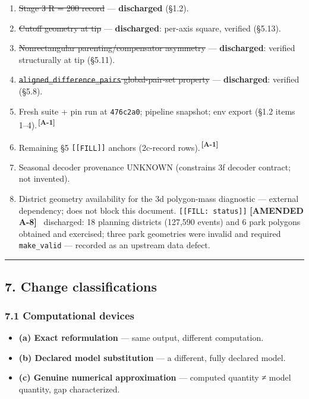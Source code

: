 \documentclass[
  10pt,
]{article}
\def\st#1{#1}  %
\providecommand{\tightlist}{%
  \setlength{\itemsep}{0pt}\setlength{\parskip}{0pt}}
\newcommand{\amdstrike}[1]{\sout{#1}}
\newcommand{\amdstrike}[1]{\textcolor{supcolor}{#1}}
\renewcommand{\st}[1]{\amdstrike{#1}}
\newcommand{\amdref}[1]{{\color{amdcolor}\textsuperscript{\,\textbf{[#1]}}}}
\newcommand{\amd}[1]{{\color{amdcolor}\footnotesize\textbf{[AMENDED #1]}}\ }
\begin{document}
\begin{enumerate}
\def\labelenumi{\arabic{enumi}.}
\setcounter{enumi}{10}
\tightlist
\item
  \st{Stage 3 R = 200 record} --- \textbf{discharged} (§1.2).
\item
  \st{Cutoff geometry at tip} --- \textbf{discharged}: per-axis square, verified (§5.13).
\item
  \st{Nonrectangular parenting/compensator asymmetry} --- \textbf{discharged}: verified structurally at tip (§5.11).
\item
  \st{\mbox{\texttt{aligned\_\allowbreak{}difference\_\allowbreak{}pairs}} global-pair-set property} --- \textbf{discharged}: verified (§5.8).
\item
  Fresh suite + pin run at \texttt{476c2a0}; pipeline snapshot; env export (§1.2 items 1--4).\amdref{A-1}
\item
  Remaining §5 \texttt{{[}{[}FILL{]}{]}} anchors (2c-record rows).\amdref{A-1}
\item
  Seasonal decoder provenance UNKNOWN (constrains 3f decoder contract; not invented).
\item
  District geometry availability for the 3d polygon-mass diagnostic --- external dependency; does not block this document. \texttt{{[}{[}FILL:\ status{]}{]}} \amd{A-8} discharged: 18 planning districts (127,590 events) and 6 park polygons obtained and exercised; three park geometries were invalid and required \texttt{make\_valid} --- recorded as an upstream data defect.
\end{enumerate}

\begin{center}\rule{0.5\linewidth}{0.5pt}\end{center}

\hypertarget{change-classifications}{%
\subsection{7. Change classifications}\label{change-classifications}}

\hypertarget{computational-devices}{%
\subsubsection{7.1 Computational devices}\label{computational-devices}}

\begin{itemize}
\tightlist
\item
  \textbf{(a) Exact reformulation} --- same output, different computation.
\item
  \textbf{(b) Declared model substitution} --- a different, fully declared model.
\item
  \textbf{(c) Genuine numerical approximation} --- computed quantity ≠ model quantity, gap characterized.
\end{itemize}
\end{document}
